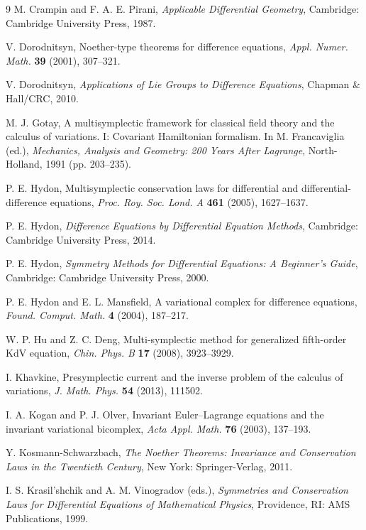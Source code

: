 \documentclass[11pt]{article} %
\numberwithin{equation}{section}
\theoremstyle{plain}
\theoremstyle{definition}
\begin{document}
\begin{thebibliography}{9}
  M. Crampin and F. A. E. Pirani, \textit{Applicable Differential Geometry}, Cambridge: Cambridge University Press, 1987.

 V. Dorodnitsyn, Noether-type theorems for difference equations, {\it Appl. Numer. Math.} {\bf 39} (2001), 307--321.

 V. Dorodnitsyn, {\it Applications of Lie Groups to Difference Equations}, Chapman \& Hall/CRC, 2010.

 M. J. Gotay, A multisymplectic framework for classical field theory and the calculus of variations. I: Covariant Hamiltonian formalism. In M. Francaviglia (ed.), \textit{Mechanics, Analysis and Geometry: 200 Years After Lagrange}, North-Holland, 1991 (pp. 203--235).

 P. E. Hydon, Multisymplectic conservation laws for differential and differential-difference equations, {\it Proc. Roy. Soc. Lond. A} {\bf 461} (2005), 1627--1637.

 P. E. Hydon, {\it Difference Equations by Differential Equation Methods}, Cambridge: Cambridge University Press, 2014.

 P. E. Hydon, {\it Symmetry Methods for Differential Equations: A Beginner's Guide}, Cambridge: Cambridge University Press, 2000.

 P. E. Hydon and E. L. Mansfield, A variational complex for difference equations, {\it Found. Comput. Math.} {\bf 4} (2004), 187--217.
              
 W. P. Hu and Z. C. Deng, Multi-symplectic method for generalized fifth-order KdV equation, {\it Chin. Phys. B} {\bf 17} (2008), 3923--3929.

 I. Khavkine, Presymplectic current and the inverse problem of the calculus of variations, \textit{J. Math. Phys.} {\bf 54} (2013), 111502.

 I. A. Kogan and P. J. Olver, Invariant Euler--Lagrange equations and the invariant variational bicomplex, {\it Acta Appl. Math.} {\bf 76} (2003), 137--193.

 Y. Kosmann-Schwarzbach, {\it The Noether Theorems: Invariance and Conservation Laws in the Twentieth Century}, New York: Springer-Verlag, 2011.

 I. S. Krasil'shchik and A. M. Vinogradov (eds.), {\it Symmetries and Conservation Laws for Differential Equations of Mathematical Physics}, Providence, RI: AMS Publications, 1999.


\end{thebibliography}
\end{document}
